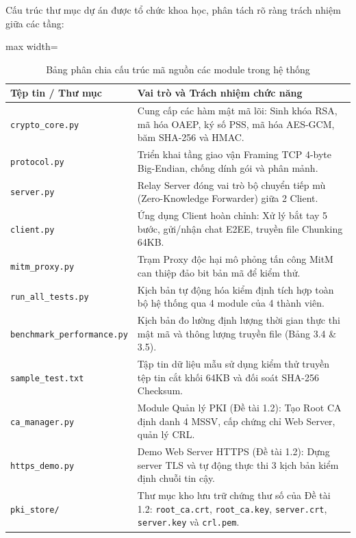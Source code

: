 \documentclass[a4paper,12pt]{article}
\renewcommand{\arraystretch}{1.2}
\begin{document}
Cấu trúc thư mục dự án được tổ chức khoa học, phân tách rõ ràng trách nhiệm giữa các tầng:
\begin{table}[H]
\centering
\renewcommand{\arraystretch}{1.15}
\begin{adjustbox}{max width=\textwidth}
\begin{tabular}{|l|p{10cm}|}
\hline
\textbf{Tệp tin / Thư mục} & \textbf{Vai trò và Trách nhiệm chức năng} \\ \hline
\texttt{crypto\_core.py} & Cung cấp các hàm mật mã lõi: Sinh khóa RSA, mã hóa OAEP, ký số PSS, mã hóa AES-GCM, băm SHA-256 và HMAC. \\ \hline
\texttt{protocol.py} & Triển khai tầng giao vận Framing TCP 4-byte Big-Endian, chống dính gói và phân mảnh. \\ \hline
\texttt{server.py} & Relay Server đóng vai trò bộ chuyển tiếp mù (Zero-Knowledge Forwarder) giữa 2 Client. \\ \hline
\texttt{client.py} & Ứng dụng Client hoàn chỉnh: Xử lý bắt tay 5 bước, gửi/nhận chat E2EE, truyền file Chunking 64KB. \\ \hline
\texttt{mitm\_proxy.py} & Trạm Proxy độc hại mô phỏng tấn công MitM can thiệp đảo bit bản mã để kiểm thử. \\ \hline
\texttt{run\_all\_tests.py} & Kịch bản tự động hóa kiểm định tích hợp toàn bộ hệ thống qua 4 module của 4 thành viên. \\ \hline
\texttt{benchmark\_performance.py} & Kịch bản đo lường định lượng thời gian thực thi mật mã và thông lượng truyền file (Bảng 3.4 \& 3.5). \\ \hline
\texttt{sample\_test.txt} & Tập tin dữ liệu mẫu sử dụng kiểm thử truyền tệp tin cắt khối 64KB và đối soát SHA-256 Checksum. \\ \hline
\texttt{ca\_manager.py} & Module Quản lý PKI (Đề tài 1.2): Tạo Root CA định danh 4 MSSV, cấp chứng chỉ Web Server, quản lý CRL. \\ \hline
\texttt{https\_demo.py} & Demo Web Server HTTPS (Đề tài 1.2): Dựng server TLS và tự động thực thi 3 kịch bản kiểm định chuỗi tin cậy. \\ \hline
\texttt{pki\_store/} & Thư mục kho lưu trữ chứng thư số của Đề tài 1.2: \texttt{root\_ca.crt}, \texttt{root\_ca.key}, \texttt{server.crt}, \texttt{server.key} và \texttt{crl.pem}. \\ \hline
\end{tabular}
\end{adjustbox}
\caption{Bảng phân chia cấu trúc mã nguồn các module trong hệ thống}
\label{tab:source_structure}
\end{table}
\end{document}
